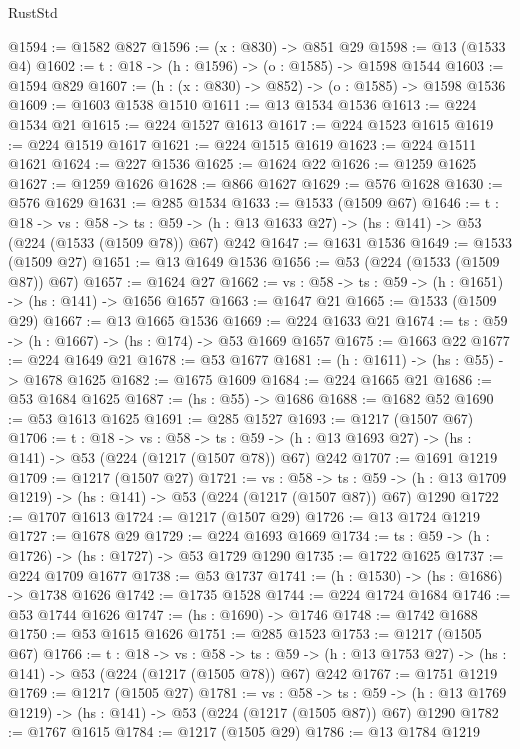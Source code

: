 \begin{lexlean}{RustStd}
\begin{coremodule}
@1594 := @1582 @827
@1596 := (x : @830) -> @851 @29
@1598 := @13 (@1533 @4)
@1602 := {t : @18} -> (h : @1596) -> (o : @1585) -> @1598 @1544
@1603 := @1594 @829
@1607 := (h : (x : @830) -> @852) -> (o : @1585) -> @1598 @1536
@1609 := @1603 @1538 @1510
@1611 := @13 @1534 @1536
@1613 := @224 @1534 @21
@1615 := @224 @1527 @1613
@1617 := @224 @1523 @1615
@1619 := @224 @1519 @1617
@1621 := @224 @1515 @1619
@1623 := @224 @1511 @1621
@1624 := @227 @1536
@1625 := @1624 @22
@1626 := @1259 @1625
@1627 := @1259 @1626
@1628 := @866 @1627
@1629 := @576 @1628
@1630 := @576 @1629
@1631 := @285 @1534
@1633 := @1533 (@1509 @67)
@1646 := {t : @18} ->
  {vs : @58} ->
  {ts : @59} -> (h : @13 @1633 @27) -> (hs : @141) -> @53 (@224 (@1533 (@1509 @78)) @67) @242
@1647 := @1631 @1536
@1649 := @1533 (@1509 @27)
@1651 := @13 @1649 @1536
@1656 := @53 (@224 (@1533 (@1509 @87)) @67)
@1657 := @1624 @27
@1662 := {vs : @58} -> {ts : @59} -> (h : @1651) -> (hs : @141) -> @1656 @1657
@1663 := @1647 @21
@1665 := @1533 (@1509 @29)
@1667 := @13 @1665 @1536
@1669 := @224 @1633 @21
@1674 := {ts : @59} -> (h : @1667) -> (hs : @174) -> @53 @1669 @1657
@1675 := @1663 @22
@1677 := @224 @1649 @21
@1678 := @53 @1677
@1681 := (h : @1611) -> (hs : @55) -> @1678 @1625
@1682 := @1675 @1609
@1684 := @224 @1665 @21
@1686 := @53 @1684 @1625
@1687 := (hs : @55) -> @1686
@1688 := @1682 @52
@1690 := @53 @1613 @1625
@1691 := @285 @1527
@1693 := @1217 (@1507 @67)
@1706 := {t : @18} ->
  {vs : @58} ->
  {ts : @59} -> (h : @13 @1693 @27) -> (hs : @141) -> @53 (@224 (@1217 (@1507 @78)) @67) @242
@1707 := @1691 @1219
@1709 := @1217 (@1507 @27)
@1721 := {vs : @58} ->
  {ts : @59} -> (h : @13 @1709 @1219) -> (hs : @141) -> @53 (@224 (@1217 (@1507 @87)) @67) @1290
@1722 := @1707 @1613
@1724 := @1217 (@1507 @29)
@1726 := @13 @1724 @1219
@1727 := @1678 @29
@1729 := @224 @1693 @1669
@1734 := {ts : @59} -> (h : @1726) -> (hs : @1727) -> @53 @1729 @1290
@1735 := @1722 @1625
@1737 := @224 @1709 @1677
@1738 := @53 @1737
@1741 := (h : @1530) -> (hs : @1686) -> @1738 @1626
@1742 := @1735 @1528
@1744 := @224 @1724 @1684
@1746 := @53 @1744 @1626
@1747 := (hs : @1690) -> @1746
@1748 := @1742 @1688
@1750 := @53 @1615 @1626
@1751 := @285 @1523
@1753 := @1217 (@1505 @67)
@1766 := {t : @18} ->
  {vs : @58} ->
  {ts : @59} -> (h : @13 @1753 @27) -> (hs : @141) -> @53 (@224 (@1217 (@1505 @78)) @67) @242
@1767 := @1751 @1219
@1769 := @1217 (@1505 @27)
@1781 := {vs : @58} ->
  {ts : @59} -> (h : @13 @1769 @1219) -> (hs : @141) -> @53 (@224 (@1217 (@1505 @87)) @67) @1290
@1782 := @1767 @1615
@1784 := @1217 (@1505 @29)
@1786 := @13 @1784 @1219

\end{coremodule}
\end{lexlean}
